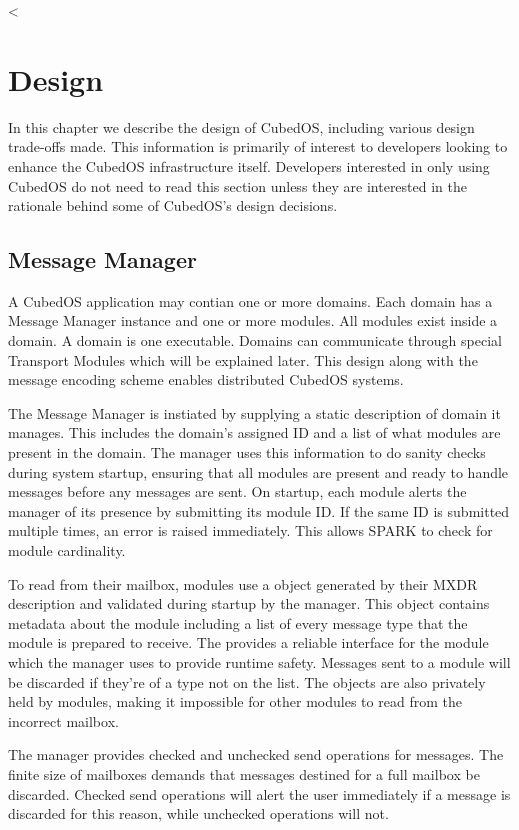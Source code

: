 <
\chapter{Design}
\label{chapt:design}

In this chapter we describe the design of CubedOS, including various design trade-offs made.
This information is primarily of interest to developers looking to enhance the CubedOS
infrastructure itself. Developers interested in only using CubedOS do not need to read this
section unless they are interested in the rationale behind some of CubedOS's design decisions.

\section{Message Manager}
\label{sec:design-message-manager}

A CubedOS application may contian one or more domains. Each domain has a Message Manager instance and one or more modules. All modules exist inside a domain. A domain is one executable. Domains can communicate through special Transport Modules which will be explained later. This design along with the message encoding scheme enables distributed CubedOS systems.

The Message Manager is instiated by supplying a static description of domain it manages. This includes the domain's assigned ID and a list of what modules are present in the domain. The manager uses this information to do sanity checks during system startup, ensuring that all modules are present and ready to handle messages before any messages are sent. On startup, each module alerts the manager of its presence by submitting its module ID. If the same ID is submitted multiple times, an error is raised immediately. This allows SPARK to check for module cardinality.

To read from their mailbox, modules use a object generated by their MXDR description and validated during startup by the manager. This object contains metadata about the module including a list of every message type that the module is prepared to receive. The provides a reliable interface for the module which the manager uses to provide runtime safety. Messages sent to a module will be discarded if they're of a type not on the list. The objects are also privately held by modules, making it impossible for other modules to read from the incorrect mailbox.

The manager provides checked and unchecked send operations for messages. The finite size of mailboxes demands that messages destined for a full mailbox be discarded. Checked send operations will alert the user immediately if a message is discarded for this reason, while unchecked operations will not.

